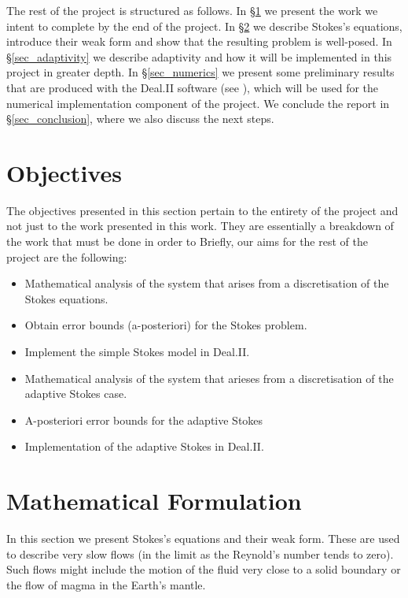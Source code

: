 \documentclass[12pt,a4paper]{article}
\theoremstyle{definition}
\begin{document}
The rest of the project is structured as follows.  In \S \ref{sec_obj} we present the work we intent to complete by the end of the project.  In \S \ref{sec_mathform} we describe Stokes's equations, introduce their weak form and show that the resulting problem is well-posed.  In \S \ref{sec_adaptivity} we  describe adaptivity and how it will be implemented in this project in greater depth.  In \S \ref{sec_numerics} we present some preliminary results that are produced with the Deal.II software (see \cite{BangerthHartmannKanschat2007}), which  will be used for the numerical implementation component of the project.  We conclude the report in \S \ref{sec_conclusion}, where we also discuss the next steps.

\section{Objectives}\label{sec_obj}
The objectives presented in this section pertain to the entirety of the project and not just to the work presented in this work.  They are essentially a breakdown of the work that must be done in order to  Briefly, our aims for the rest of the project are the following:
\begin{itemize}
\item Mathematical analysis of the system that arises from a discretisation of the Stokes equations.
\item Obtain error bounds (a-posteriori) for the Stokes problem.
\item Implement the simple Stokes model in Deal.II.
\item Mathematical analysis of the system that arieses from a discretisation of the adaptive Stokes case.
\item A-posteriori error bounds for the adaptive Stokes
\item Implementation of the adaptive Stokes in Deal.II.
\end{itemize}

\section{Mathematical Formulation}\label{sec_mathform}
In this section we present Stokes's equations and their weak form.   These are used to describe very slow flows (in the limit as the Reynold's number tends to zero).  Such flows might include the motion of the fluid very close to a solid boundary or the flow of magma in the Earth's mantle.  
\end{document}
